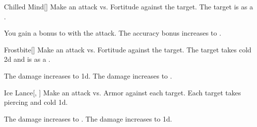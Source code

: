 \lowercase{\hypertarget{spell:Chilled Mind}{}}\label{spell:Chilled Mind}
\begin{freeability}[Rank 3]{\hypertarget{spell:Chilled Mind}{Chilled Mind}}[]
Make an attack vs. Fortitude against the target.
\hit The target is  as a .

\rankline
{} You gain a  bonus to  with the attack.
 The accuracy bonus increases to .

\end{freeability}
\vspace{0.25em}



\lowercase{\hypertarget{spell:Frostbite}{}}\label{spell:Frostbite}
\begin{freeability}[Rank 3]{\hypertarget{spell:Frostbite}{Frostbite}}[]
Make an attack vs. Fortitude against the target.
\hit The target takes cold  \minus2d and is  as a .

\rankline
{} The damage increases to  \minus1d.
 The damage increases to .

\end{freeability}
\vspace{0.25em}



\lowercase{\hypertarget{spell:Ice Lance}{}}\label{spell:Ice Lance}
\begin{freeability}[Rank 3]{\hypertarget{spell:Ice Lance}{Ice Lance}}[, ]
Make an attack vs. Armor against each target.
\hit Each target takes piercing and cold  \minus1d.

\rankline
{} The damage increases to .
 The damage increases to  \plus1d.

\end{freeability}
\vspace{0.25em}




